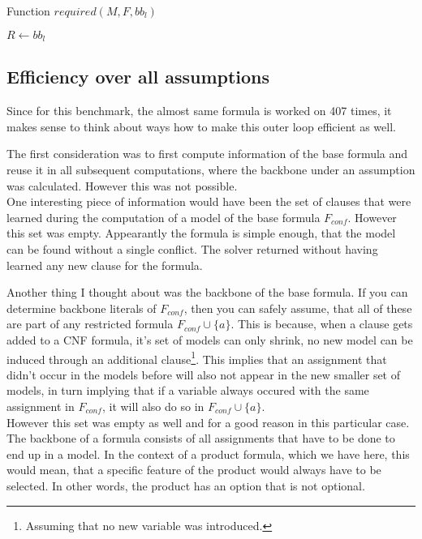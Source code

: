\begin{algorithm}
\caption{{\sc Function $required(M,F,bb_l)$ }}
\label{alg:specReq}
\DontPrintSemicolon
{}
$R \gets bb_l$\;
\;

\end{algorithm}




\subsection{Efficiency over all assumptions}
Since for this benchmark, the almost same formula is worked on 407 times, it makes sense to think about ways how to make this outer loop efficient as well.

The first consideration was to first compute information of the base formula and reuse it in all subsequent computations, where the backbone under an assumption was calculated. However this was not possible.\\
One interesting piece of information would have been the set of clauses that were learned during the computation of a model of the base formula $F_{conf}$. However this set was empty. Appearantly the formula is simple enough, that the model can be found without a single conflict. The solver returned without having learned any new clause for the formula.

Another thing I thought about was the backbone of the base formula. If you can determine backbone literals of $F_{conf}$, then you can safely assume, that all of these are part of any restricted formula $F_{conf} \cup \{a\}$. This is because, when a clause gets added to a CNF formula, it's set of models can only shrink, no new model can be induced through an additional clause\footnote{Assuming that no new variable was introduced.}. This implies that an assignment that didn't occur in the models before will also not appear in the new smaller set of models, in turn implying that if a variable always occured with the same assignment in $F_{conf}$, it will also do so in $F_{conf} \cup \{a\}$. \\
However this set was empty as well and for a good reason in this particular case. The backbone of a formula consists of all assignments that have to be done to end up in a model. In the context of a product formula, which we have here, this would mean, that a specific feature of the product would always have to be selected. In other words, the product has an option that is not optional. 

